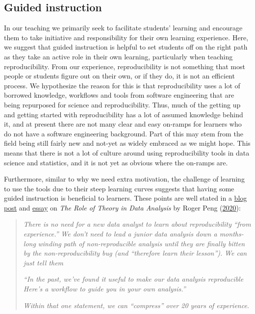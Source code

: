 \documentclass{article}
\begin{document}
\hypertarget{guided-instruction}{%
\subsection{Guided instruction}\label{guided-instruction}}

In our teaching we primarily seek to facilitate students' learning and
encourage them to take initiative and responsibility for their own
learning experience. Here, we suggest that guided instruction is helpful
to set students off on the right path as they take an active role in
their own learning, particularly when teaching reproducibility. From our
experience, reproducibility is not something that most people or
students figure out on their own, or if they do, it is not an efficient
process. We hypothesize the reason for this is that reproducibility uses
a lot of borrowed knowledge, workflows and tools from software
engineering that are being repurposed for science and reproducibility.
Thus, much of the getting up and getting started with reproducibility
has a lot of assumed knowledge behind it, and at present there are not
many clear and easy on-ramps for learners who do not have a software
engineering background. Part of this may stem from the field being still
fairly new and not-yet as widely embraced as we might hope. This means
that there is not a lot of culture around using reproducibility tools in
data science and statistics, and it is not yet as obvious where the
on-ramps are.

Furthermore, similar to why we need extra motivation, the challenge of
learning to use the tools due to their steep learning curves suggests
that having some guided instruction is beneficial to learners. These
points are well stated in a
\href{https://simplystatistics.org/2018/12/11/the-role-of-theory-in-data-analysis/}{blog
post} and \href{https://leanpub.com/dataanalysisessays}{essay} on
\emph{The Role of Theory in Data Analysis} by Roger Peng
(\protect\hyperlink{ref-peng2020essays}{2020}):

\begin{quote}
\emph{There is no need for a new data analyst to learn about
reproducibility} \emph{``from experience.''} \emph{We don't need to lead
a junior data analysis down a months-long} \emph{winding path of
non-reproducible analysis until they are finally bitten} \emph{by the
non-reproducibility bug (and ``therefore learn their lesson'').}
\emph{We can just tell them}

\emph{``In the past, we've found it useful to make our data analysis
reproducible\emph{ }Here's a workflow to guide you in your own
analysis.''}

\emph{Within that one statement, we can ``compress'' over 20 years of
experience.}
\end{quote}
\end{document}
